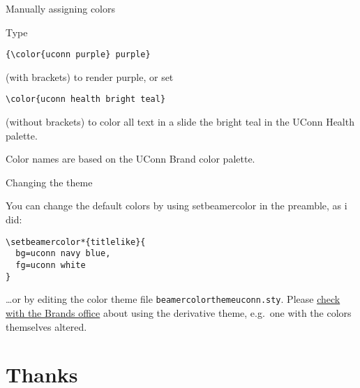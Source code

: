 \documentclass{beamer}
\begin{document}
\begin{frame}[fragile]{Manually assigning colors}

Type
\begin{verbatim}
{\color{uconn purple} purple}
\end{verbatim}
(with brackets) to render {\color{uconn purple} purple}, or set
\begin{verbatim}
\color{uconn health bright teal}
\end{verbatim}
\color{uconn health bright teal}
(without brackets) to color all text in a slide the bright teal in the UConn Health palette.

\color{black}\vfill
Color names are based on the UConn Brand color palette.

\center\hyperlink{http://brand.uconn.edu/standards/color-palette/}{}

\end{frame}


\begin{frame}[fragile]{Changing the theme}

You can change the default colors by using setbeamercolor in the preamble, as i did:
\begin{verbatim}
\setbeamercolor*{titlelike}{
  bg=uconn navy blue,
  fg=uconn white
}
\end{verbatim}
\ldots or by editing the color theme file {\tt beamercolorthemeuconn.sty}.
Please \hyperlink{mailto:brand@uconn.edu}{check with the Brands office} about using the derivative theme, e.g.\ one with the colors themselves altered.

\end{frame}


\section{Thanks}
\end{document}

